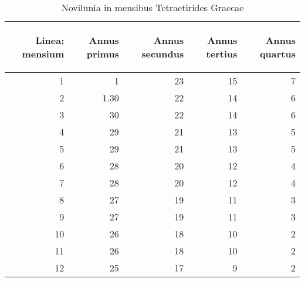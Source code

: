 \begin{table}[htbp]
\centering
\begin{tabular}{| r | r | r | r | r |}
\hline
\begin{sideways}
Linea: mensium
\end{sideways}
&
\begin{sideways}
Annus primus
\end{sideways}
&
\begin{sideways}
Annus secundus
\end{sideways}
&
\begin{sideways}
Annus tertius
\end{sideways}
&
\begin{sideways}
Annus quartus
\end{sideways}
\\
\hline
  1 & 1    & 23 & 15 & 7
\\ \cline{2-5}
  2 & 1.30 & 22 & 14 & 6
\\ \cline{2-5}
  3 & 30   & 22 & 14 & 6
\\ \cline{2-5}
  4 & 29   & 21 & 13 & 5
\\ \cline{2-5}
  5 & 29   & 21 & 13 & 5
\\ \cline{2-5}
  6 & 28   & 20 & 12 & 4
\\ \cline{2-5}
  7 & 28   & 20 & 12 & 4
\\ \cline{2-5}
  8 & 27   & 19 & 11 & 3
\\ \cline{2-5}
  9 & 27   & 19 & 11 & 3
\\ \cline{2-5}
 10 & 26   & 18 & 10 & 2
\\ \cline{2-5}
 11 & 26   & 18 & 10 & 2
\\ \cline{2-5}
 12 & 25   & 17 &  9 & 2
\\
\hline
\end{tabular}

\caption{Novilunia in mensibus Tetraetirides Graecae}
\label{tab:novilunia}
\end{table}
